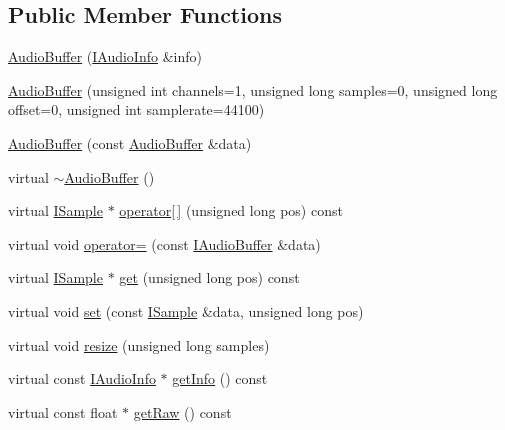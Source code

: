 \subsection*{Public Member Functions}
\begin{DoxyCompactItemize}
\item 
\hyperlink{classmaudio_1_1AudioBuffer_aaf9868a32b5d236f05c18eab92dc8fbc}{Audio\-Buffer} (\hyperlink{classmaudio_1_1IAudioInfo}{I\-Audio\-Info} \&info)
\item 
\hyperlink{classmaudio_1_1AudioBuffer_aacc7c601e16cb298852e4cd8bf0b9877}{Audio\-Buffer} (unsigned int channels=1, unsigned long samples=0, unsigned long offset=0, unsigned int samplerate=44100)
\item 
\hyperlink{classmaudio_1_1AudioBuffer_a114fe8fbb88ebbd2bd10d2db87bfb72b}{Audio\-Buffer} (const \hyperlink{classmaudio_1_1AudioBuffer}{Audio\-Buffer} \&data)
\item 
virtual \hyperlink{classmaudio_1_1AudioBuffer_af8297698130918e9edcdfefaccdbd19c}{$\sim$\-Audio\-Buffer} ()
\item 
virtual \hyperlink{classmaudio_1_1ISample}{I\-Sample} $\ast$ \hyperlink{classmaudio_1_1AudioBuffer_a6548ddb981ec41fa92d821a15aa06080}{operator\mbox{[}$\,$\mbox{]}} (unsigned long pos) const 
\item 
virtual void \hyperlink{classmaudio_1_1AudioBuffer_afdd22331a8ac4e0643f2e0732be5b223}{operator=} (const \hyperlink{classmaudio_1_1IAudioBuffer}{I\-Audio\-Buffer} \&data)
\item 
virtual \hyperlink{classmaudio_1_1ISample}{I\-Sample} $\ast$ \hyperlink{classmaudio_1_1AudioBuffer_a93eeb4f2f16bf113e8bc77592d7c4664}{get} (unsigned long pos) const 
\item 
virtual void \hyperlink{classmaudio_1_1AudioBuffer_a3f19c9611c89947bbf27af7f788b8347}{set} (const \hyperlink{classmaudio_1_1ISample}{I\-Sample} \&data, unsigned long pos)
\item 
virtual void \hyperlink{classmaudio_1_1AudioBuffer_aeed134c3a1b7f5446594fa23c8857e8c}{resize} (unsigned long samples)
\item 
virtual const \hyperlink{classmaudio_1_1IAudioInfo}{I\-Audio\-Info} $\ast$ \hyperlink{classmaudio_1_1AudioBuffer_aa5e0294c0de7b4bbcaed0afa9ae22728}{get\-Info} () const 
\item 
virtual const float $\ast$ \hyperlink{classmaudio_1_1AudioBuffer_a6ac54537437e8a3fc4236b9375dc0126}{get\-Raw} () const 
\end{DoxyCompactItemize}


